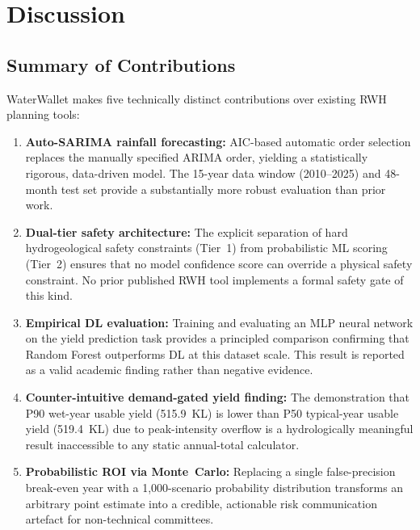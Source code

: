 \documentclass[conference]{IEEEtran}
\begin{document}

\section{Discussion}
\label{sec:discussion}

\subsection{Summary of Contributions}

WaterWallet makes five technically distinct contributions over existing RWH
planning tools:

\begin{enumerate}
  \item \textbf{Auto-SARIMA rainfall forecasting:} AIC-based automatic order
    selection replaces the manually specified ARIMA order, yielding a
    statistically rigorous, data-driven model. The 15-year data window
    (2010--2025) and 48-month test set provide a substantially more robust
    evaluation than prior work.

  \item \textbf{Dual-tier safety architecture:} The explicit separation of
    hard hydrogeological safety constraints (Tier~1) from probabilistic ML
    scoring (Tier~2) ensures that no model confidence score can override a
    physical safety constraint. No prior published RWH tool implements a
    formal safety gate of this kind.

  \item \textbf{Empirical DL evaluation:} Training and evaluating an MLP
    neural network on the yield prediction task provides a principled
    comparison confirming that Random Forest outperforms DL at this dataset
    scale. This result is reported as a valid academic finding rather than
    negative evidence.

  \item \textbf{Counter-intuitive demand-gated yield finding:} The
    demonstration that P90 wet-year usable yield (515.9~KL) is lower than
    P50 typical-year usable yield (519.4~KL) due to peak-intensity overflow
    is a hydrologically meaningful result inaccessible to any static
    annual-total calculator.

  \item \textbf{Probabilistic ROI via Monte~Carlo:} Replacing a single
    false-precision break-even year with a 1,000-scenario probability
    distribution transforms an arbitrary point estimate into a credible,
    actionable risk communication artefact for non-technical committees.
\end{enumerate}
\end{document}
